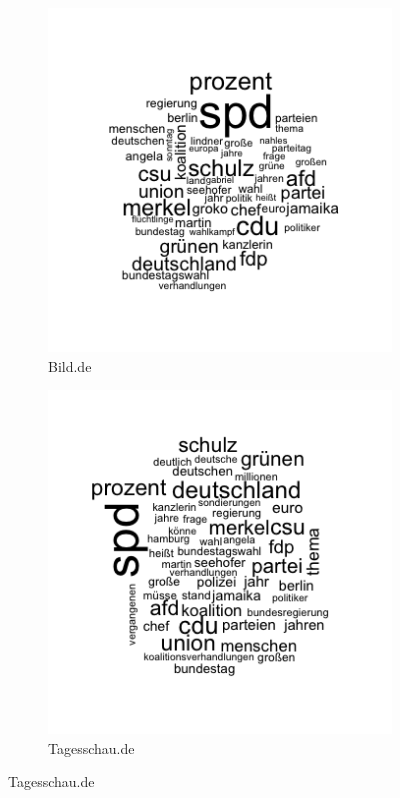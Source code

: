 \documentclass[12pt,a4paper,notitlepage]{article}
\begin{document}
\begin{figure}[H]
	\caption{Wordclouds (after pre-processing)}
	\begin{center}
		\begin{subfigure}[normla]{0.48\textwidth}
			\includegraphics[width=\textwidth]{figs/wordcloud_Bild.png}
			\caption{Bild.de}
		\end{subfigure}
		\begin{subfigure}[normla]{0.48\textwidth}
			\includegraphics[width=\textwidth]{figs/wordcloud_Tagesschau.png}
			\caption{Tagesschau.de}
		\end{subfigure}
	\end{center}
\end{figure}
\end{document}
